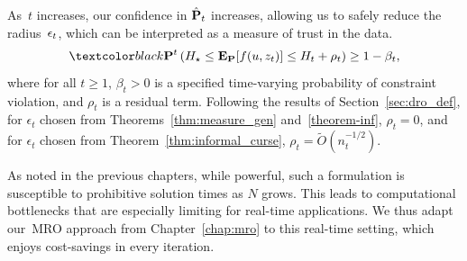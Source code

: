 As~$t$ increases, our confidence in $\hat{{\mathbf P}}_t$ increases, allowing us to safely reduce the radius~$\epsilon_t$, which can be interpreted as a measure of trust in the data.
\begin{equation}
	\label{c3:eq:prob_guarantees1}
	\RC{\prob^{t}\left( H_\star \leq \mathbf{E}_{\prob}[f(u, z_t)] \le H_t + \rho_{t}\right) \ge 1 - \beta_{t},}
\end{equation}
where for all $t\geq 1$, $\beta_{t} > 0$ is a specified time-varying
probability of constraint violation, and $\rho_{t}$ is a residual term.
Following the results of Section~\ref{sec:dro_def}, for $\epsilon_t$ chosen from Theorems~\ref{thm:measure_gen} and~\ref{theorem-inf}, $\rho_t = 0$, and for $\epsilon_t$ chosen from Theorem~\ref{thm:informal_curse}, $\rho_t = \tilde{O}(n_t^{-1/2})$.

As noted in the previous chapters, while powerful, such a formulation is susceptible to prohibitive solution times as $N$ grows. This leads to computational bottlenecks that are especially limiting for real-time applications. We thus adapt our~\gls{MRO} approach from Chapter~\ref{chap:mro} to this real-time setting, which enjoys cost-savings in every iteration. 

